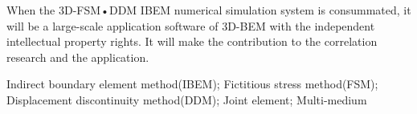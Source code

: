 When the 3D-FSM•DDM IBEM numerical simulation system is consummated, it will be a large-scale application software of 3D-BEM with the independent intellectual property rights. It will make the contribution to the correlation research and the application.

{\bfseries{}} Indirect boundary element method(IBEM); Fictitious stress method(FSM); Displacement discontinuity method(DDM); Joint element; Multi-medium

\clearpage

